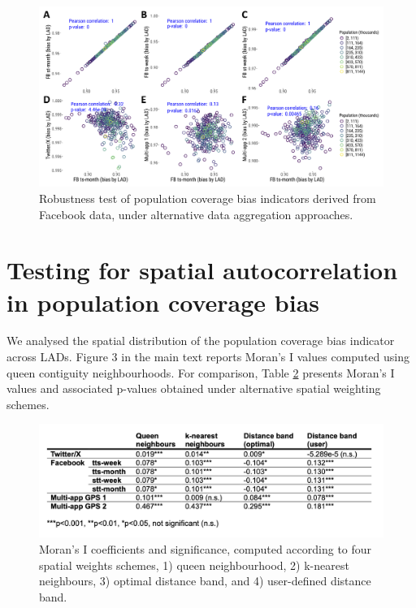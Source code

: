 \documentclass[]{rsos}%
\begin{document}
\begin{figure}[h]\label{fig:sensitivity}
\includegraphics[width=\textwidth]{figures/Fig-compare-bias-size.png}
\caption{Robustness test of population coverage bias indicators derived from Facebook data, under alternative data aggregation approaches.}
\end{figure}

\newpage

\section{Testing for spatial autocorrelation in population coverage bias}\label{testing-for-spatial-autocorrelation-in-population-coverage-bias}

We analysed the spatial distribution of the population coverage bias indicator across LADs. Figure 3 in the main text reports Moran's I values computed using queen contiguity neighbourhoods. For comparison, Table \ref{fig:table-neighbour} presents Moran's I values and associated p-values obtained under alternative spatial weighting schemes.

\begin{figure}[h]
\label{fig:table-neighbour}
\includegraphics[width=\textwidth]{figures/Table-si.png}
\caption{Moran's I coefficients and significance,
computed according to four spatial weights schemes, 1) queen
neighbourhood, 2) k-nearest neighbours, 3) optimal distance band, and 4)
user-defined distance band.}
\end{figure}
\end{document}
